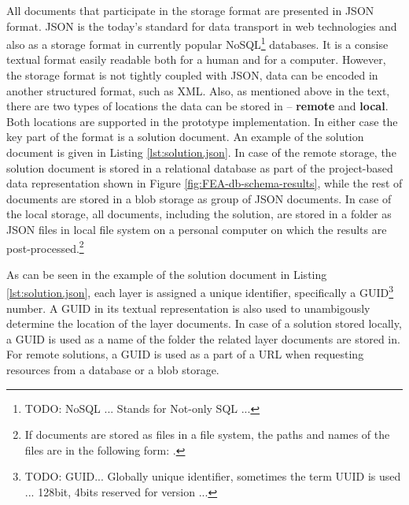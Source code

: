 All documents that participate in the storage format are presented in JSON format. JSON is the today's standard for data transport in web technologies and also as a storage format in currently popular NoSQL\footnote{TODO: NoSQL ... Stands for Not-only SQL ...} databases. It is a consise textual format easily readable both for a human and for a computer. However, the storage format is not tightly coupled with JSON, data can be encoded in another structured format, such as XML. Also, as mentioned above in the text, there are two types of locations the data can be stored in -- \textbf{remote} and \textbf{local}. Both locations are supported in the prototype implementation. In either case the key part of the format is a solution document. An example of the solution document is given in Listing \ref{lst:solution.json}. In case of the remote storage, the solution document is stored in a relational database as part of the project-based data representation shown in Figure \ref{fig:FEA-db-schema-results}, while the rest of documents are stored in a blob storage as group of JSON documents. In case of the local storage, all documents, including the solution, are stored in a folder as JSON files in local file system on a personal computer on which the results are post-processed.\footnote{If documents are stored as files in a file system, the paths and names of the files are in the following form:
.}

As can be seen in the example of the solution document in Listing \ref{lst:solution.json}, each layer is assigned a unique identifier, specifically a GUID\footnote{TODO: GUID... Globally unique identifier, sometimes the term UUID is used ... 128bit, 4bits reserved for version ...} number. A GUID in its textual representation is also used to unambigously determine the location of the layer documents. In case of a solution stored locally, a GUID is used as a name of the folder the related layer documents are stored in. For remote solutions, a GUID is used as a part of a URL when requesting resources from a database or a blob storage.


